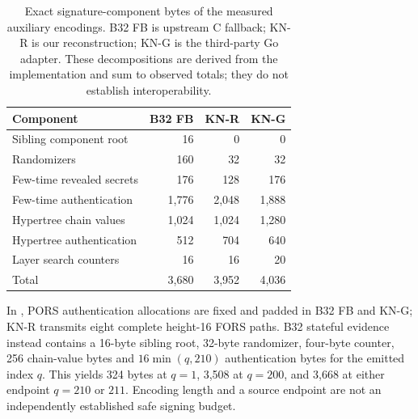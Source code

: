 \begin{table}[t]
\caption{Exact signature-component bytes of the measured auxiliary encodings. B32 FB is upstream C fallback; KN-R is our reconstruction; KN-G is the third-party Go adapter. These decompositions are derived from the implementation and sum to observed totals; they do not establish interoperability.}\label{tab:comparison-aux-bytes}
\centering\small
\begin{tabular}{lrrr}\toprule
Component & B32 FB & KN-R & KN-G\\\midrule
Sibling component root &16&0&0\\
Randomizers &160&32&32\\
Few-time revealed secrets &176&128&176\\
Few-time authentication &1,776&2,048&1,888\\
Hypertree chain values &1,024&1,024&1,280\\
Hypertree authentication &512&704&640\\
Layer search counters &16&16&20\\\midrule
Total &3,680&3,952&4,036\\\bottomrule
\end{tabular}
\end{table}
In , PORS authentication allocations are fixed and padded in B32 FB and KN-G; KN-R transmits eight complete height-16 FORS paths. B32 stateful evidence instead contains a 16-byte sibling root, 32-byte randomizer, four-byte counter, 256 chain-value bytes and $16\min(q,210)$ authentication bytes for the emitted index $q$. This yields 324 bytes at $q=1$, 3,508 at $q=200$, and 3,668 at either endpoint $q=210$ or $211$. Encoding length and a source endpoint are not an independently established safe signing budget.

